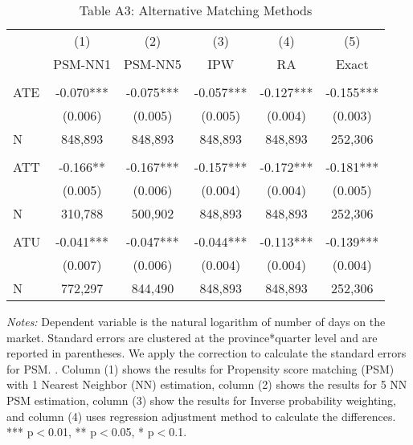 \documentclass[12pt]{article}
\begin{document}
\begin{table}[H]
\scriptsize
  \centering
  \caption*{Table A3: Alternative Matching Methods}
      \begin{tabular}{lccccc}
\hline
                &\multicolumn{1}{c}{(1)}&\multicolumn{1}{c}{(2)}&\multicolumn{1}{c}{(3)}&\multicolumn{1}{c}{(4)}&\multicolumn{1}{c}{(5)}\\
                     & PSM-NN1 & PSM-NN5 & IPW & RA & Exact  \\
\hline
&&&&&\\

ATE     & -0.070*** & -0.075*** & -0.057*** &  -0.127*** & -0.155***
    \\
          & (0.006) &   (0.005)  & (0.005) & (0.004) & (0.003) \\
N &  848,893 &  848,893 &  848,893 &  848,893  & 252,306   \\    
\\
ATT         & -0.166** & -0.167*** & -0.157*** & -0.172*** & -0.181***
     \\
          & (0.005) &  (0.006)& (0.004) & (0.004) & (0.005) \\
N & 310,788 &  500,902 &  848,893 &  848,893  & 252,306  \\       
\\          
ATU            & -0.041*** &  -0.047*** & -0.044*** & -0.113*** & -0.139*** \\
              & (0.007)   & (0.006) & (0.004) & (0.004) & (0.004) \\
N &  772,297 &  844,490 &  848,893 &  848,893  & 252,306  \\       
\hline

    \end{tabular}%
\begin{tablenotes}
\scriptsize
\item \textit{Notes:} Dependent variable is the natural logarithm of number of days on the market. Standard errors are clustered at the province*quarter level and are reported in parentheses. We apply the \citep{abadie2016matching} correction to calculate the standard errors for PSM. .  Column (1) shows the results for Propensity score matching (PSM) with 1 Nearest Neighbor (NN) estimation, column (2) shows the results for 5 NN PSM estimation, column (3) show the results for Inverse probability weighting, and column (4) uses regression adjustment method to calculate the differences.  *** p$<$0.01, ** p$<$0.05, * p$<$0.1.
\end{tablenotes}

  \label{tab:addlabel}%
\end{table}%
\end{document}
